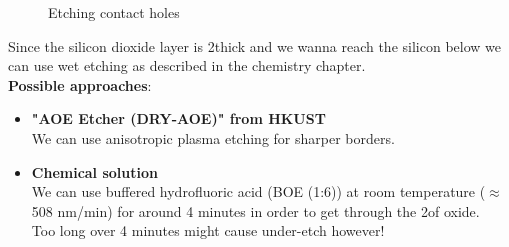 \begin{figure}[H]
	\centering
	\begin{tikzpicture}[node distance = 3cm, auto, thick,scale=\CrossAndTopSection, every node/.style={transform shape}]
		
	\end{tikzpicture}
	\begin{tikzpicture}[node distance = 3cm, auto, thick,scale=\CrossAndTopSection, every node/.style={transform shape}]
		
	\end{tikzpicture}
	\drawStepArrow{}
	\begin{tikzpicture}[node distance = 3cm, auto, thick,scale=\CrossAndTopSection, every node/.style={transform shape}]
		
	\end{tikzpicture}
	\begin{tikzpicture}[node distance = 3cm, auto, thick,scale=\CrossAndTopSection, every node/.style={transform shape}]
		
	\end{tikzpicture}
	\caption{Etching contact holes}
\end{figure}

Since the silicon dioxide layer is 2\um thick and we wanna reach the silicon below we can use wet etching as described in the chemistry chapter.\\

\textbf{Possible approaches}:
\begin{itemize}
	\item \textbf{"AOE Etcher (DRY-AOE)" from HKUST} \\
	We can use anisotropic plasma etching for sharper borders.
	\item \textbf{Chemical solution} \\
	We can use buffered hydrofluoric acid (BOE (1:6)) at room temperature ($\approx$508 nm/min) for around 4 minutes in order to get through the 2\um of oxide.\\
	Too long over 4 minutes might cause under-etch however!
\end{itemize}

